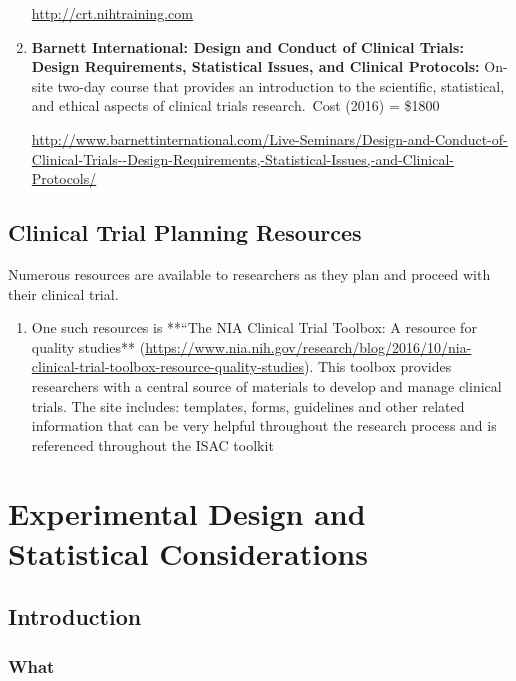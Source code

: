 \documentclass[]{book}
\providecommand{\tightlist}{%
  \setlength{\itemsep}{0pt}\setlength{\parskip}{0pt}}
\begin{document}
\begin{enumerate}
  \href{http://crt.nihtraining.com/}{http://crt.nihtraining.com}
\item
  \textbf{Barnett International: Design and Conduct of Clinical Trials:
  Design Requirements, Statistical Issues, and Clinical Protocols:}
  On-site two-day course that provides an introduction to the
  scientific, statistical, and ethical aspects of clinical trials
  research.~Cost (2016) = \$1800

  \url{http://www.barnettinternational.com/Live-Seminars/Design-and-Conduct-of-Clinical-Trials--Design-Requirements,-Statistical-Issues,-and-Clinical-Protocols/}
\end{enumerate}

\section{Clinical Trial Planning
Resources}\label{clinical-trial-planning-resources}

Numerous resources are available to researchers as they plan and proceed
with their clinical trial.

\begin{enumerate}
\def\labelenumi{\arabic{enumi}.}
\tightlist
\item
  One such resources is **``The NIA Clinical Trial Toolbox: A resource
  for quality studies**
  (\url{https://www.nia.nih.gov/research/blog/2016/10/nia-clinical-trial-toolbox-resource-quality-studies}).
  This toolbox provides researchers with a central source of materials
  to develop and manage clinical trials. The site includes: templates,
  forms, guidelines and other related information that can be very
  helpful throughout the research process and is referenced throughout
  the ISAC toolkit
\end{enumerate}

\chapter{Experimental Design and Statistical
Considerations}\label{experimental-design-and-statistical-considerations}

\section{Introduction}\label{introduction-1}

\subsection{What}\label{what}
\end{document}
